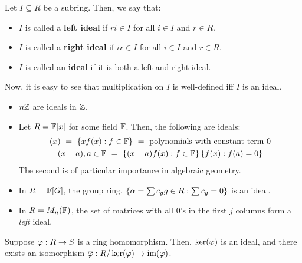 \begin{defn}
    Let $ I \subseteq R $ be a subring. Then, we say that:
    \begin{itemize}
        \item $ I $ is called a \textbf{left ideal} if
            $ ri \in I $ for all $ i \in I $ and $ r \in R $.
        \item $ I $ is called a \textbf{right ideal} if
            $ ir \in I $ for all $ i \in I $ and $ r \in R $.
        \item $ I $ is called an \textbf{ideal} if it is both a left and right ideal.
    \end{itemize}
\end{defn}
Now, it is easy to see that multiplication on $ I $ is well-defined iff $ I $ is an ideal.
\vspace{-0.1in}
\begin{xmp}[source=Primary Source Material]
    \begin{itemize}
        \item $ n\mathbb{Z} $ are ideals in $ \mathbb{Z} $.
        \item Let $ R = \mathbb{F}[x] $ for some field $ \mathbb{F} $. Then, the following are ideals:
            \vspace{-0.07in}
            \begin{gather*}
                (x) \ = \ \set{xf(x) : f \in \bb{F}} \ = \ \trm{polynomials with constant term 0}
                \\
                (x-a), a \in \bb{F} \ = \ \set{(x-a)f(x):f \in \bb{F}} \set{f(x):f(a)=0}
            \end{gather*}
            The second is of particular importance in algebraic geometry.
        \item In $ R = \mathbb{F}[G] $, the group ring,
            $ \left\{{\alpha=\sum c_{g}g \in R:\sum c_{g} = 0}\right\} $ is an ideal.
        \item In $ R = M_{n}(\mathbb{F}) $, the set of matrices with all $ 0 $'s in the first $ j $
            columns form a \textit{left} ideal.
    \end{itemize}
\end{xmp}

\begin{thm}[title=First Isomorphism for Rings]
    Suppose $ \operatorname{\varphi}: R \rightarrow S $ is a ring homomorphism. Then, $ \ker(\operatorname{\varphi}) $ is an ideal,
    and there exists an isomorphism $ \overline{\operatorname{\varphi}}: R/\ker(\operatorname{\varphi}) \rightarrow \operatorname{im}(\operatorname{\varphi}) $.
\end{thm}
\vspace{-0.1in}

